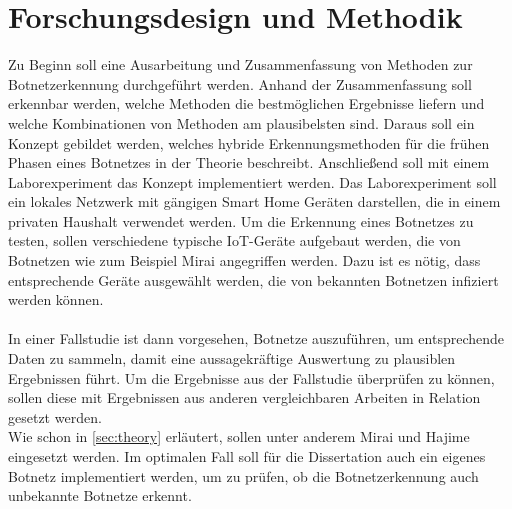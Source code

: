 \section{Forschungsdesign und Methodik}
\label{sec:methods}

Zu Beginn soll eine Ausarbeitung und Zusammenfassung von Methoden zur Botnetzerkennung durchgeführt werden. Anhand der Zusammenfassung soll 
erkennbar werden, welche Methoden die bestmöglichen Ergebnisse liefern und welche Kombinationen von Methoden am plausibelsten sind.
Daraus soll ein Konzept gebildet werden, welches hybride Erkennungsmethoden für die frühen Phasen eines Botnetzes in der Theorie beschreibt.
Anschließend soll mit einem Laborexperiment das Konzept implementiert werden. Das Laborexperiment soll ein lokales Netzwerk mit gängigen Smart Home 
Geräten darstellen, die in einem privaten Haushalt verwendet werden. Um die Erkennung eines Botnetzes zu testen, sollen verschiedene typische
IoT-Geräte aufgebaut werden, die von Botnetzen wie zum Beispiel Mirai angegriffen werden. Dazu ist es nötig, dass entsprechende Geräte ausgewählt werden, 
die von bekannten Botnetzen infiziert werden können. \\ \\ In einer Fallstudie ist dann vorgesehen, Botnetze auszuführen, um entsprechende Daten
zu sammeln, damit eine aussagekräftige Auswertung zu plausiblen Ergebnissen führt. Um die Ergebnisse aus der Fallstudie überprüfen
zu können, sollen diese mit Ergebnissen aus anderen vergleichbaren Arbeiten in Relation gesetzt werden. \\ Wie schon in \ref{sec:theory}
erläutert, sollen unter anderem Mirai und Hajime eingesetzt werden. Im optimalen Fall soll für die Dissertation auch ein eigenes Botnetz
implementiert werden, um zu prüfen, ob die Botnetzerkennung auch unbekannte Botnetze erkennt.
